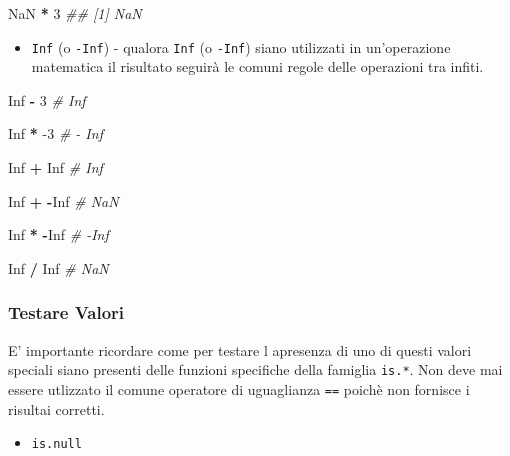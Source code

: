 \documentclass[
]{book}
\newenvironment{Shaded}{\begin{snugshade}}{\end{snugshade}}
\newcommand{\CommentTok}[1]{\textcolor[rgb]{0.56,0.35,0.01}{\textit{#1}}}
\newcommand{\DecValTok}[1]{\textcolor[rgb]{0.00,0.00,0.81}{#1}}
\newcommand{\OperatorTok}[1]{\textcolor[rgb]{0.81,0.36,0.00}{\textbf{#1}}}
\newcommand{\OtherTok}[1]{\textcolor[rgb]{0.56,0.35,0.01}{#1}}
\newcommand{\StringTok}[1]{\textcolor[rgb]{0.31,0.60,0.02}{#1}}
\providecommand{\tightlist}{%
  \setlength{\itemsep}{0pt}\setlength{\parskip}{0pt}}
\begin{document}
\begin{Shaded}
\begin{Highlighting}[]
\OtherTok{NaN} \OperatorTok{*}\StringTok{ }\DecValTok{3}
\CommentTok{## [1] NaN}
\end{Highlighting}
\end{Shaded}

\begin{itemize}
\tightlist
\item
  \texttt{Inf} (o \texttt{-Inf}) - qualora \texttt{Inf} (o \texttt{-Inf}) siano utilizzati in un'operazione matematica il risultato seguirà le comuni regole delle operazioni tra infiti.
\end{itemize}

\begin{Shaded}
\begin{Highlighting}[]
\OtherTok{Inf} \OperatorTok{-}\StringTok{ }\DecValTok{3}     \CommentTok{# Inf}

\OtherTok{Inf} \OperatorTok{*}\StringTok{ }\DecValTok{-3}    \CommentTok{# - Inf}

\OtherTok{Inf} \OperatorTok{+}\StringTok{ }\OtherTok{Inf}   \CommentTok{# Inf}

\OtherTok{Inf} \OperatorTok{+}\StringTok{ }\OperatorTok{-}\OtherTok{Inf}  \CommentTok{# NaN}

\OtherTok{Inf} \OperatorTok{*}\StringTok{ }\OperatorTok{-}\OtherTok{Inf}  \CommentTok{# -Inf}

\OtherTok{Inf} \OperatorTok{/}\StringTok{ }\OtherTok{Inf}   \CommentTok{# NaN}
\end{Highlighting}
\end{Shaded}

\hypertarget{testare-valori}{%
\subsubsection*{Testare Valori}\label{testare-valori}}

E' importante ricordare come per testare l apresenza di uno di questi valori speciali siano presenti delle funzioni specifiche della famiglia \texttt{is.*}. Non deve mai essere utlizzato il comune operatore di uguaglianza \texttt{==} poichè non fornisce i risultai corretti.

\begin{itemize}
\tightlist
\item
  \texttt{is.null}
\end{itemize}
\end{document}
